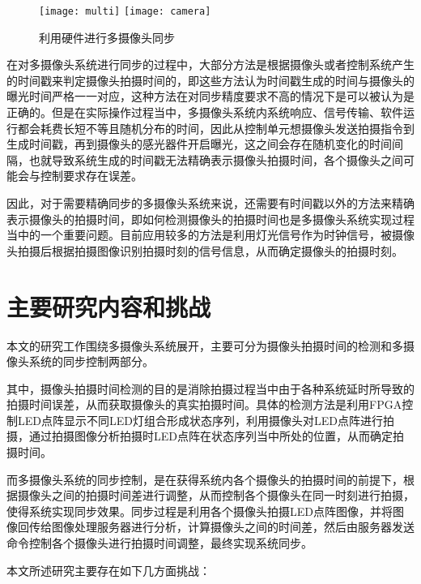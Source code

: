 \begin{figure}[h]
  \centering%
    {\texttt{[image: multi]}}
    \hspace{4em}%
      {\texttt{[image: camera]}}
  \caption{利用硬件进行多摄像头同步}
\end{figure}

在对多摄像头系统进行同步的过程中，大部分方法是根据摄像头或者控制系统产生的时间戳来判定摄像头拍摄时间的，即这些方法认为时间戳生成的时间与摄像头的曝光时间严格一一对应，这种方法在对同步精度要求不高的情况下是可以被认为是正确的。但是在实际操作过程当中，多摄像头系统内系统响应、信号传输、软件运行都会耗费长短不等且随机分布的时间，因此从控制单元想摄像头发送拍摄指令到生成时间戳，再到摄像头的感光器件开启曝光，这之间会存在随机变化的时间间隔，也就导致系统生成的时间戳无法精确表示摄像头拍摄时间，各个摄像头之间可能会与控制要求存在误差。

因此，对于需要精确同步的多摄像头系统来说，还需要有时间戳以外的方法来精确表示摄像头的拍摄时间，即如何检测摄像头的拍摄时间也是多摄像头系统实现过程当中的一个重要问题。目前应用较多的方法是利用灯光信号作为时钟信号，被摄像头拍摄后根据拍摄图像识别拍摄时刻的信号信息，从而确定摄像头的拍摄时刻。

\section{主要研究内容和挑战}

本文的研究工作围绕多摄像头系统展开，主要可分为摄像头拍摄时间的检测和多摄像头系统的同步控制两部分。

其中，摄像头拍摄时间检测的目的是消除拍摄过程当中由于各种系统延时所导致的拍摄时间误差，从而获取摄像头的真实拍摄时间。具体的检测方法是利用FPGA控制LED点阵显示不同LED灯组合形成状态序列，利用摄像头对LED点阵进行拍摄，通过拍摄图像分析拍摄时LED点阵在状态序列当中所处的位置，从而确定拍摄时间。

而多摄像头系统的同步控制，是在获得系统内各个摄像头的拍摄时间的前提下，根据摄像头之间的拍摄时间差进行调整，从而控制各个摄像头在同一时刻进行拍摄，使得系统实现同步效果。同步过程是利用各个摄像头拍摄LED点阵图像，并将图像回传给图像处理服务器进行分析，计算摄像头之间的时间差，然后由服务器发送命令控制各个摄像头进行拍摄时间调整，最终实现系统同步。

本文所述研究主要存在如下几方面挑战：


